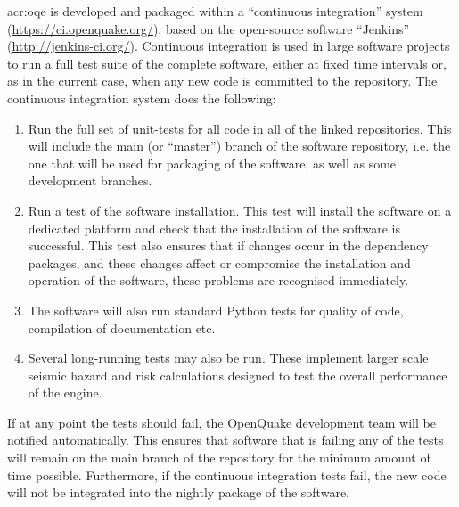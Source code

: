 \gls{acr:oqe} is developed and packaged within a ``continuous integration'' system (\href{https://ci.openquake.org/}{https://ci.openquake.org/}),
based on the open-source software ``Jenkins'' (\href{http://jenkins-ci.org/}{http://jenkins-ci.org/}). Continuous integration is used in large software projects to run a full test suite of the complete software, either at fixed time intervals or, as in the current case, when any new code is committed to the repository. The continuous integration system does the following:

\begin{enumerate}
\item Run the full set of unit-tests for all code in all of the linked repositories. This will include the main (or ``master'') branch of the software repository, i.e. the one that will be used for packaging of the software, as well as some development branches.
\item Run a test of the software installation. This test will install the software on a dedicated platform and check that the installation of the software is successful. This test also ensures that if changes occur in the dependency packages, and these changes affect or compromise the installation and operation of the software, these problems are recognised immediately.
\item The software will also run standard Python tests for quality of code, compilation of documentation etc.
\item Several long-running tests may also be run. These implement larger scale seismic hazard and risk calculations designed to test the overall performance of the engine.
\end{enumerate}

If at any point the tests should fail, the OpenQuake development team will be notified automatically. This ensures that software that is failing any of the tests will remain on the main branch of the repository for the minimum amount of time possible. Furthermore, if the continuous integration tests fail, the new code will not be integrated into the nightly package of the software.